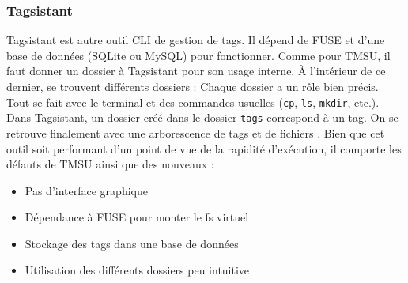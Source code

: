 \documentclass[a4paper, 12pt]{article}
\begin{document}
\subsubsection{Tagsistant}
Tagsistant \cite{ref16} est autre outil CLI de gestion de tags. Il dépend de FUSE et d'une base 
de données (SQLite ou MySQL) pour fonctionner. Comme pour TMSU, il faut donner un dossier à Tagsistant 
pour son usage interne. À l'intérieur de ce dernier, se trouvent différents dossiers :
\bigbreak
Chaque dossier a un rôle bien précis. Tout se fait avec le terminal et des commandes usuelles 
(\texttt{cp}, \texttt{ls}, \texttt{mkdir}, etc.). Dans Tagsistant, 
un dossier créé dans le dossier \texttt{tags} correspond à un tag. On se retrouve 
finalement avec une arborescence de tags et de fichiers \cite{ref17}. Bien que cet outil soit 
performant d'un point de vue de la rapidité d'exécution, il comporte les défauts de TMSU ainsi que 
des nouveaux :
\begin{itemize}
    \item Pas d'interface graphique
    \item Dépendance à FUSE pour monter le \acrshort{fs} virtuel
    \item Stockage des tags dans une base de données
    \item Utilisation des différents dossiers peu intuitive
\end{itemize} 
\end{document}
